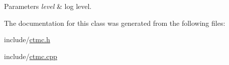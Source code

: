\begin{DoxyParams}{Parameters}
{\em level} & log level. \\
\hline
\end{DoxyParams}


The documentation for this class was generated from the following files\+:\begin{DoxyCompactItemize}
\item 
include/\hyperlink{ctmc_8h}{ctmc.\+h}\item 
include/\hyperlink{ctmc_8cpp}{ctmc.\+cpp}\end{DoxyCompactItemize}
